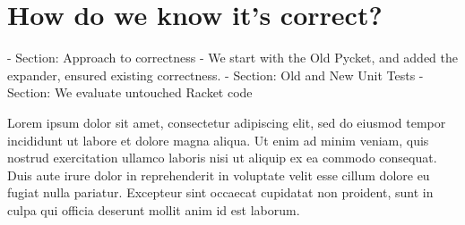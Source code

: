 \chapter{How do we know it's correct?}

	- Section: Approach to correctness
		- We start with the Old Pycket, and added the expander, ensured existing correctness.
	- Section: Old and New Unit Tests
	- Section: We evaluate untouched Racket code

Lorem ipsum dolor sit amet, consectetur adipiscing elit, sed do eiusmod tempor incididunt ut labore et dolore magna aliqua. Ut enim ad minim veniam, quis nostrud exercitation ullamco laboris nisi ut aliquip ex ea commodo consequat. Duis aute irure dolor in reprehenderit in voluptate velit esse cillum dolore eu fugiat nulla pariatur. Excepteur sint occaecat cupidatat non proident, sunt in culpa qui officia deserunt mollit anim id est laborum.
